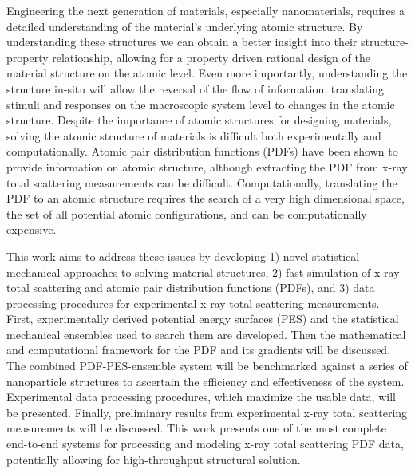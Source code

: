 Engineering the next generation of materials, especially nanomaterials, requires a detailed understanding of the material's underlying atomic structure.
By understanding these structures we can obtain a better insight into their structure-property relationship, allowing for a property driven rational design of the material structure on the atomic level.
Even more importantly, understanding the structure in-situ will allow the reversal of the flow of information, translating stimuli and responses on the macroscopic system level to changes in the atomic structure.
Despite the importance of atomic structures for designing materials, solving the atomic structure of materials is difficult both experimentally and computationally.
Atomic pair distribution functions (PDFs) have been shown to provide information on atomic structure, although extracting the PDF from x-ray total scattering measurements can be difficult.
Computationally, translating the PDF to an atomic structure requires the search of a very high dimensional space, the set of all potential atomic configurations, and can be computationally expensive.

This work aims to address these issues by developing 1) novel statistical mechanical approaches to solving material structures, 2)  fast simulation of x-ray total scattering and atomic pair distribution functions (PDFs), and 3) data processing procedures for experimental x-ray total scattering measurements.
First, experimentally derived potential energy surfaces (PES) and the statistical mechanical ensembles used to search them are developed.
Then the mathematical and computational framework for the PDF and its gradients will be discussed.
The combined PDF-PES-ensemble system will be benchmarked against a series of nanoparticle structures to ascertain the efficiency and effectiveness of the system.
Experimental data processing procedures, which maximize the usable data, will be presented.
Finally, preliminary results from experimental x-ray total scattering measurements will be discussed.
This work presents one of the most complete end-to-end systems for processing and modeling x-ray total scattering PDF data, potentially allowing for high-throughput structural solution.